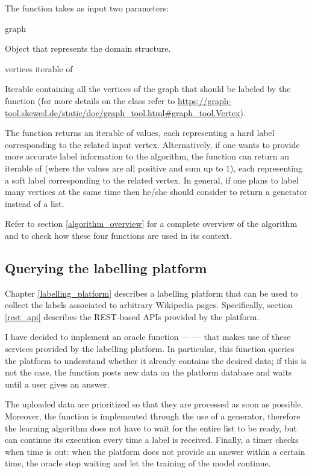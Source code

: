             The  function takes as input two parameters:
            \begin{parameters}
                \item[graph] 
                
                Object that represents the domain structure.
                \item[vertices] iterable of 
                
                Iterable containing all the vertices of the graph that should be labeled by the  function (for more details on the  class refer to \url{https://graph-tool.skewed.de/static/doc/graph_tool.html#graph_tool.Vertex}).
            \end{parameters}
            
            The  function returns an iterable of  values, each representing a hard label corresponding to the related input vertex. Alternatively, if one wants to provide more accurate label information to the algorithm, the  function can return an iterable of  (where the values are all positive and sum up to \(1\)), each representing a soft label corresponding to the related vertex. In general, if one plans to label many vertices at the same time then he/she should consider to return a generator instead of a list.
            
            Refer to section \ref{algorithm_overview} for a complete overview of the algorithm and to check how these four functions are used in its context.
        \subsection{Querying the labelling platform}
            Chapter \ref{labelling_platform} describes a labelling platform that can be used to collect the labels associated to arbitrary Wikipedia pages. Specifically, section \ref{rest_api} describes the REST-based APIs provided by the platform.
            
            I have decided to implement an oracle function ---  --- that makes use of these services provided by the labelling platform. In particular, this function queries the platform to understand whether it already contains the desired data; if this is not the case, the function posts new data on the platform database and waits until a user gives an answer.
            
            The uploaded data are prioritized so that they are processed as soon as possible. Moreover, the function is implemented through the use of a generator, therefore the learning algorithm does not have to wait for the entire list to be ready, but can continue its execution every time a label is received. Finally, a timer checks when time is out: when the platform does not provide an answer within a certain time, the oracle stop waiting and let the training of the model continue.